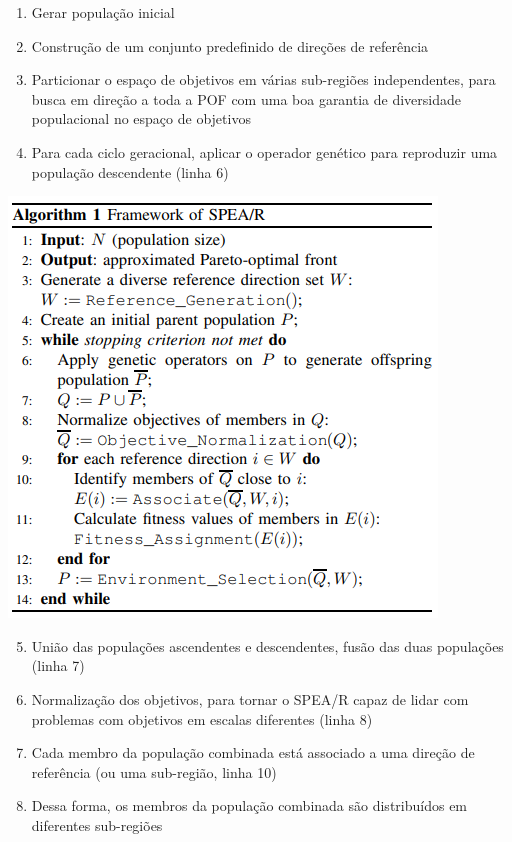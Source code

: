 \documentclass{rbfin}
\begin{document}
\begin{enumerate}[label=(\arabic*), itemsep=0mm]
  \item Gerar população inicial
  \item Construção de um conjunto predefinido de direções de referência
  \item Particionar o espaço de objetivos em várias sub-regiões independentes, para busca em direção a toda a POF com uma boa garantia de diversidade populacional no espaço de objetivos
  \item Para cada ciclo geracional, aplicar o operador genético para reproduzir uma população descendente (linha 6)
\end{enumerate}

\begin{center}
\includegraphics[scale=1]{alg1}
\end{center}

\begin{enumerate}[label=(\arabic*), itemsep=0mm]
  \setcounter{enumi}{4}
  \item União das populações ascendentes e descendentes, fusão das duas populações (linha 7)
  \item Normalização dos objetivos, para tornar o SPEA/R capaz de lidar com problemas com objetivos em escalas diferentes (linha 8)
  \item Cada membro da população combinada está associado a uma direção de referência (ou uma sub-região, linha 10)
  \item Dessa forma, os membros da população combinada são distribuídos em diferentes sub-regiões
\end{enumerate}
\end{document}
